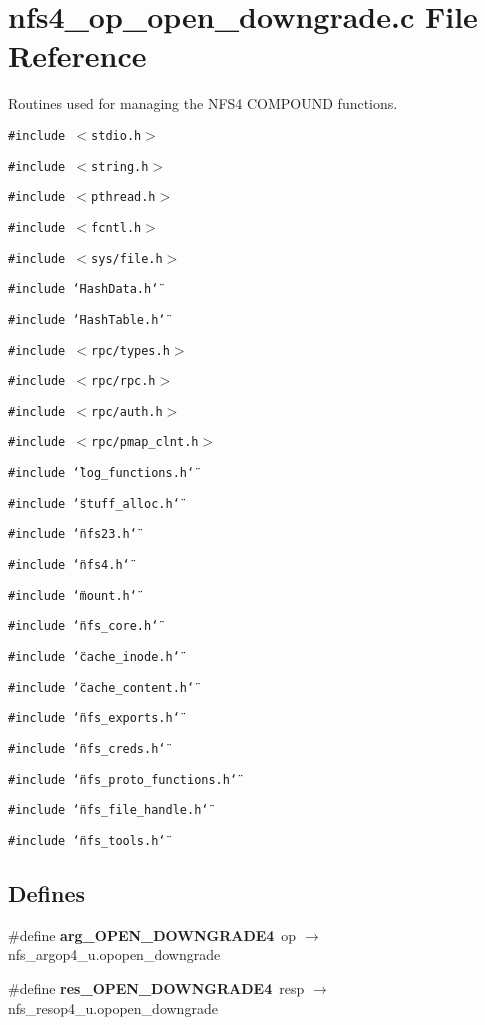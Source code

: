 \section{nfs4\_\-op\_\-open\_\-downgrade.c File Reference}
\label{nfs4__op__open__downgrade_8c}
Routines used for managing the NFS4 COMPOUND functions. 

{\tt \#include $<$stdio.h$>$}\par
{\tt \#include $<$string.h$>$}\par
{\tt \#include $<$pthread.h$>$}\par
{\tt \#include $<$fcntl.h$>$}\par
{\tt \#include $<$sys/file.h$>$}\par
{\tt \#include \char`\"{}Hash\-Data.h\char`\"{}}\par
{\tt \#include \char`\"{}Hash\-Table.h\char`\"{}}\par
{\tt \#include $<$rpc/types.h$>$}\par
{\tt \#include $<$rpc/rpc.h$>$}\par
{\tt \#include $<$rpc/auth.h$>$}\par
{\tt \#include $<$rpc/pmap\_\-clnt.h$>$}\par
{\tt \#include \char`\"{}log\_\-functions.h\char`\"{}}\par
{\tt \#include \char`\"{}stuff\_\-alloc.h\char`\"{}}\par
{\tt \#include \char`\"{}nfs23.h\char`\"{}}\par
{\tt \#include \char`\"{}nfs4.h\char`\"{}}\par
{\tt \#include \char`\"{}mount.h\char`\"{}}\par
{\tt \#include \char`\"{}nfs\_\-core.h\char`\"{}}\par
{\tt \#include \char`\"{}cache\_\-inode.h\char`\"{}}\par
{\tt \#include \char`\"{}cache\_\-content.h\char`\"{}}\par
{\tt \#include \char`\"{}nfs\_\-exports.h\char`\"{}}\par
{\tt \#include \char`\"{}nfs\_\-creds.h\char`\"{}}\par
{\tt \#include \char`\"{}nfs\_\-proto\_\-functions.h\char`\"{}}\par
{\tt \#include \char`\"{}nfs\_\-file\_\-handle.h\char`\"{}}\par
{\tt \#include \char`\"{}nfs\_\-tools.h\char`\"{}}\par
\subsection*{Defines}
\begin{CompactItemize}
\item 
\#define {\bf arg\_\-OPEN\_\-DOWNGRADE4}\ op $\rightarrow$ nfs\_\-argop4\_\-u.opopen\_\-downgrade
\item 
\#define {\bf res\_\-OPEN\_\-DOWNGRADE4}\ resp $\rightarrow$ nfs\_\-resop4\_\-u.opopen\_\-downgrade
\end{CompactItemize}
